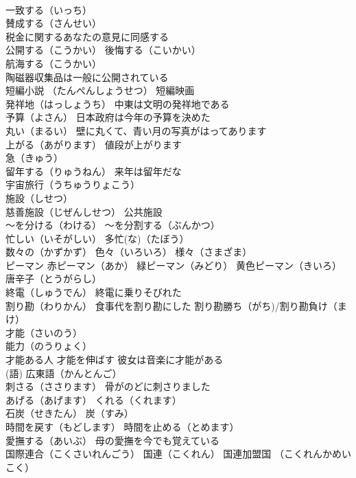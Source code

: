 \documentclass[8pt]{extreport}
\begin{document}
\begin{CJK}{UTF8}{min}
\\	一致する（いっち）
\\	賛成する（さんせい）
\\	税金に関するあなたの意見に同感する
\\	公開する（こうかい） 後悔する（こいかい）
\\	航海する（こうかい）
\\	陶磁器収集品は一般に公開されている
\\	短編小説 （たんぺんしょうせつ） 短編映画
\\	発祥地（はっしょうち） 中東は文明の発祥地である
\\	予算（よさん） 日本政府は今年の予算を決めた
\\	丸い（まるい） 壁に丸くて、青い月の写真がはってあります
\\	上がる（あがります） 値段が上がります
\\	急（きゅう）
\\	留年する（りゅうねん） 来年は留年だな
\\	宇宙旅行（うちゅうりょこう）
\\	施設（しせつ） 
\\	慈善施設（じぜんしせつ） 公共施設
\\	～を分ける（わける） ～を分割する（ぶんかつ）
\\	忙しい（いそがしい） 多忙(な)（たぼう）
\\	数々の（かずかず） 色々（いろいろ） 様々（さまざま）
\\	ピーマン 赤ピーマン（あか） 緑ピーマン（みどり） 黄色ピーマン（きいろ） 唐辛子（とうがらし）
\\	終電（しゅうでん） 終電に乗りそびれた
\\	割り勘（わりかん） 食事代を割り勘にした 割り勘勝ち（がち)/割り勘負け（まけ）
\\	才能（さいのう） 
\\	能力（のうりょく） 
\\	才能ある人 才能を伸ばす 彼女は音楽に才能がある
\\	(語)	広東語（かんとんご）
\\	刺さる（ささります） 骨がのどに刺さりました
\\	あげる（あげます） くれる（くれます）
\\	石炭（せきたん） 炭（すみ）
\\	時間を戻す（もどします） 時間を止める（とめます）
\\	愛撫する（あいぶ） 母の愛撫を今でも覚えている
\\	国際連合（こくさいれんごう） 国連（こくれん） 国連加盟国 （こくれんかめいこく）

\end{CJK}
\end{document}
